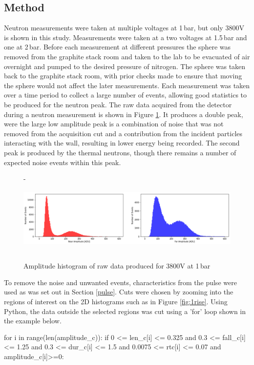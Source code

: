 \documentclass[a4paper]{article}
\begin{document}
\subsection{Method}
Neutron measurements were taken at multiple voltages at 1\,bar, but only 3800V is shown in this study. Measurements were taken at a two voltages at 1.5\,bar and one at 2\,bar.
\newline Before each measurement at different pressures the sphere was removed from the graphite stack room and taken to the lab to be evacuated of air overnight and pumped to the desired pressure of nitrogen. The sphere was taken back to the graphite stack room, with prior checks made to ensure that moving the sphere would not affect the later measurements. Each measurement was taken over a time period to collect a large number of events, allowing good statistics to be produced for the neutron peak. 
\newline The raw data acquired from the detector during a neutron measurement is shown in Figure \ref{fig:ampb}. It produces a double peak, were the large low amplitude peak is a combination of noise that was not removed from the acquisition cut and a contribution from the incident particles interacting with the wall, resulting in lower energy being recorded. The second peak is produced by the thermal neutrons, though there remains a number of expected noise events within this peak. 
\begin{figure}[H]-
    \centering
    \includegraphics[height=3.7cm]{plots/uk24n001_ampbefore.png}
    \caption{Amplitude histogram of raw data produced for 3800V at 1\,bar}
    \label{fig:ampb}
\end{figure}
\noindent To remove the noise and unwanted events, characteristics from the pulse were used as was set out in Section \ref{pulse}. Cuts were chosen by zooming into the regions of interest on the 2D histograms such as in Figure \ref{fig:1rise}. Using Python, the data outside the selected regions was cut using a 'for' loop shown in the example below.
\begin{python}
for i in range(len(amplitude_c)):
 if 0 <= len_c[i] <= 0.325 and 0.3 <= fall_c[i] <= 1.25 and 0.3 <= dur_c[i] <= 1.5 
 and 0.0075 <= rtc[i] <= 0.07 and amplitude_c[i]>=0:
\end{python}
\end{document}
